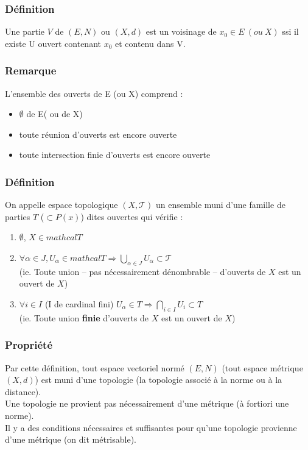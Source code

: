 \documentclass[a4paper, oneside]{report}
\newcommand{\evn}{espace vectoriel normé }
\begin{document}
\subsubsection{Définition}
Une partie $V$ de $(E,N)$ ou $(X, d)$ est un voisinage de $x_0\in E~(ou~X)$ ssi il existe U ouvert contenant $x_0$ et contenu dans V.

\subsubsection{Remarque}
L'ensemble des ouverts de E (ou X) comprend :
\begin{itemize}
\item $\emptyset$ de E( ou de X)
\item toute réunion d'ouverts est encore ouverte
\item toute intersection finie d'ouverts est encore ouverte
\end{itemize}

\subsubsection{Définition}
On appelle espace topologique $(X, \mathcal{T})$ un ensemble muni d'une famille de parties $T$ ($\subset P(x)$) dites ouvertes qui vérifie :
\begin{enumerate}
\item $\emptyset$, $X\in mathcal{T}$
\item $ \forall \alpha\in J, U_\alpha \in mathcal{T} \Rightarrow \bigcup_{\alpha \in J}U_\alpha \subset \mathcal{T}$ \\
  (ie. Toute union -- pas nécessairement dénombrable -- d'ouverts de $X$ est un ouvert de $X$)
\item $\forall i\in I$ (I de cardinal fini) $U_\alpha\in T \Rightarrow \bigcap_{i\in I}U_i\subset T$ \\
  (ie. Toute union \textbf{finie} d'ouverts de $X$ est un ouvert de $X$)
\end{enumerate}

\subsubsection{Propriété}
Par cette définition, tout \evn $(E, N)$ (tout espace métrique $(X,d)$) est muni d'une topologie (la topologie associé à la norme ou à la distance).\\
Une topologie ne provient pas nécessairement d'une métrique (à fortiori une norme).\\
Il y a des conditions nécessaires et suffisantes pour qu'une topologie provienne d'une métrique (on dit métrisable).
\end{document}
